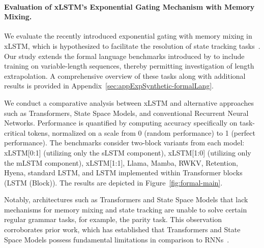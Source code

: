 \paragraph{Evaluation of xLSTM's Exponential Gating Mechanism with Memory Mixing.} We evaluate the recently introduced exponential gating with memory mixing in xLSTM, which is hypothesized to facilitate the resolution of state tracking tasks~\citep{Merrill:24, Merrill:23}. Our study extends the formal language benchmarks introduced by \citet{Deletang:23} to include training on variable-length sequences, thereby permitting investigation of length extrapolation. A comprehensive overview of these tasks along with additional results is provided in Appendix~\ref{sec:appExpSynthetic-formalLang}. 

We conduct a comparative analysis between xLSTM and alternative approaches such as Transformers, State Space Models, and conventional Recurrent Neural Networks. Performance is quantified by computing accuracy specifically on task-critical tokens, normalized on a scale from 0 (random performance) to 1 (perfect performance). The benchmarks consider two-block variants from each model: xLSTM[0:1] (utilizing only the sLSTM component), xLSTM[1:0] (utilizing only the mLSTM component), xLSTM[1:1], Llama, Mamba, RWKV, Retention, Hyena, standard LSTM, and LSTM implemented within Transformer blocks (LSTM (Block)). The results are depicted in Figure~\ref{fig:formal-main}. 

Notably, architectures such as Transformers and State Space Models that lack mechanisms for memory mixing and state tracking are unable to solve certain regular grammar tasks, for example, the parity task. This observation corroborates prior work, which has established that Transformers and State Space Models possess fundamental limitations in comparison to RNNs~\citep{Merrill:24, Merrill:23, Deletang:23}.

